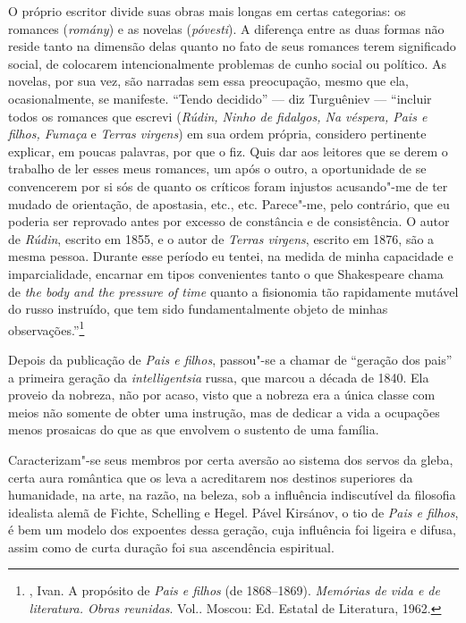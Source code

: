 O próprio escritor divide suas obras mais longas em certas categorias:
os romances (\emph{romány}) e as novelas (\emph{póvesti}). A diferença entre
as duas formas não reside tanto na dimensão delas quanto no fato de
seus romances terem significado social, de colocarem intencionalmente
problemas de cunho social ou político. As novelas, por sua vez, são
narradas sem essa preocupação, mesmo que ela, ocasionalmente, se
manifeste. ``Tendo decidido'' --- diz Turguêniev --- ``incluir todos os
romances que escrevi (\emph{Rúdin, Ninho de fidalgos, Na véspera, Pais e
filhos, Fumaça} e \emph{Terras virgens}) em sua ordem própria, considero
pertinente explicar, em poucas palavras, por que o fiz. Quis dar aos
leitores que se derem o trabalho de ler esses meus romances, um após o
outro, a oportunidade de se convencerem por si sós de quanto os críticos
foram injustos acusando"-me de ter mudado de orientação, de apostasia,
etc., etc. Parece"-me, pelo contrário, que eu poderia ser reprovado antes
por excesso de constância e de consistência. O autor de \emph{Rúdin},
escrito em 1855, e o autor de \emph{Terras virgens}, escrito em 1876,
são a mesma pessoa. Durante esse período eu tentei, na medida de minha
capacidade e imparcialidade, encarnar em tipos convenientes tanto
o que Shakespeare chama de \emph{the body and the pressure of time}
quanto a fisionomia tão rapidamente mutável do russo instruído, que tem
sido fundamentalmente objeto de minhas observações.''\footnote{, Ivan. A propósito de \emph{Pais e filhos} (de 1868--1869). \emph{Memórias de vida e de literatura. Obras reunidas}. Vol.. Moscou: Ed. Estatal de Literatura, 1962.} 

Depois da publicação de \emph{Pais e filhos}, passou"-se a chamar de
``geração dos pais'' a primeira geração da \emph{intelligentsia} russa,
que marcou a década de 1840. Ela proveio da nobreza, não por acaso,
visto que a nobreza era a única classe com meios não somente de obter
uma instrução, mas de dedicar a vida a ocupações menos prosaicas do que
as que envolvem o sustento de uma família.

Caracterizam"-se seus membros por certa aversão ao sistema dos servos
da gleba, certa aura romântica que os leva a acreditarem nos
destinos superiores da humanidade, na arte, na razão, na beleza, sob a influência indiscutível da filosofia idealista alemã de Fichte, Schelling e Hegel. Pável Kirsánov, o tio de \emph{Pais e filhos}, é bem um modelo dos expoentes dessa geração, cuja influência foi ligeira e difusa, assim como de curta duração foi sua ascendência espiritual.

